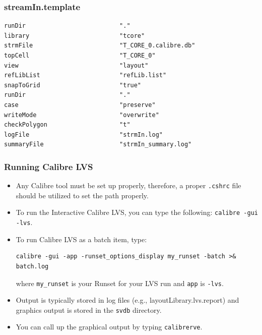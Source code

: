\documentclass{beamer}
\begin{document}
\begin{frame}[fragile]
\frametitle{streamIn.template}
\footnotesize
\begin{verbatim}
runDir                          "."
library                         "tcore"
strmFile                        "T_CORE_0.calibre.db"
topCell                         "T_CORE_0" 
view                            "layout"
refLibList                      "refLib.list"
snapToGrid                      "true"
runDir                          "."
case                            "preserve"
writeMode                       "overwrite"
checkPolygon                    "t"
logFile                         "strmIn.log"
summaryFile                     "strmIn_summary.log"
\end{verbatim}
\normalsize
\end{frame}
\begin{frame}[fragile]
\frametitle{Running Calibre LVS}
\begin{itemize}
\item Any Calibre tool must be set up properly, therefore, a proper
  \verb+.cshrc+ file should be utilized to set the path properly.
\item To run the Interactive Calibre LVS, you can type the following:
  \verb+calibre -gui -lvs+.
\item To run Calibre LVS as a batch item, type: 
\tiny
\begin{verbatim}
calibre -gui -app -runset_options_display my_runset -batch >& batch.log
\end{verbatim}
\normalsize
where \verb+my_runset+ is your Runset for your LVS run and \verb+app+
is \verb+-lvs+.
\item Output is typically stored in log files (e.g.,
  layoutLibrary.lvs.report) and graphics output is stored in the
  \verb+svdb+ directory.
\item You can call up the graphical output by typing \verb+calibrerve+.
\end{itemize}
\end{frame}
\end{document}
